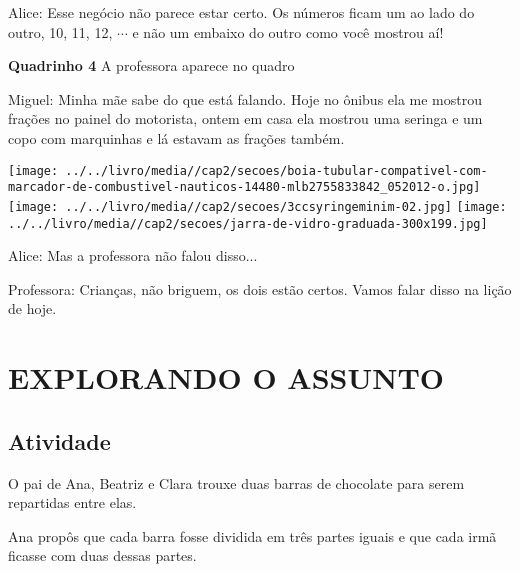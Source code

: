 \begin{imagem*}[breakable]{}{}
  Alice: Esse negócio não parece estar certo. Os números ficam um ao lado do outro, 10, 11, 12,   $\cdots$   e não um embaixo do outro como você mostrou aí!  
  
  {\bf Quadrinho 4}  
  A professora aparece no quadro  
  
  Miguel: Minha mãe sabe do que está falando. Hoje no ônibus ela me mostrou frações no painel do motorista, ontem em casa ela mostrou uma seringa e um copo com marquinhas e lá estavam as frações também.  
  
    \texttt{[image: ../../livro/media//cap2/secoes/boia-tubular-compativel-com-marcador-de-combustivel-nauticos-14480-mlb2755833842\_052012-o.jpg]}   
    \texttt{[image: ../../livro/media//cap2/secoes/3ccsyringeminim-02.jpg]}    
    \texttt{[image: ../../livro/media//cap2/secoes/jarra-de-vidro-graduada-300x199.jpg]}  
  
  
  Alice: Mas a professora não falou disso...  
  
  Professora: Crianças, não briguem, os dois estão certos. Vamos falar disso na lição de hoje.  
  
\end{imagem*}

\section{EXPLORANDO O ASSUNTO }

\subsection{Atividade}

O pai de Ana, Beatriz e Clara trouxe duas barras de chocolate para serem repartidas entre elas.

\begin{center}
\end{center}

Ana propôs que cada barra fosse dividida em três partes iguais e que cada irmã ficasse com duas dessas partes.


